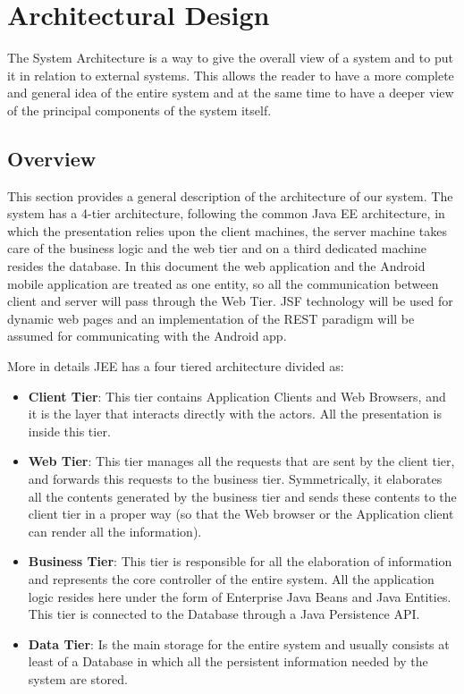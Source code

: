 \chapter{Architectural Design} \label{chap2}
The System Architecture is a way to give the overall view of a system and to put it in relation to external systems. This allows the reader to have a more complete and general idea of the entire system and at the same time to have a deeper view of the principal components of the system itself.

\section{Overview}
This section provides a general description of the architecture of our system.
The system has a 4-tier architecture, following the common Java EE architecture, in which the presentation relies upon the client machines, the server machine takes care of the business logic and the web tier and on a third dedicated machine resides the database.
In this document the web application and the Android mobile application are treated as one entity, so all the communication between client and server will pass through the Web Tier. JSF technology will be used for dynamic web pages and an implementation of the REST paradigm will be assumed for communicating with the Android app.

More in details JEE has a four tiered architecture divided as:
\begin{itemize}
	\item \textbf{Client Tier}: This tier contains Application Clients and Web Browsers, and it is the layer that interacts directly with the actors. All the presentation is inside this tier.
	\item \textbf{Web Tier}: This tier manages all the requests that are sent by the client tier, and forwards this requests to the business tier. Symmetrically, it elaborates all the contents generated by the business tier and sends these contents to the client tier in a proper way (so that the Web browser or the Application client can render all the information).
	\item \textbf{Business Tier}: This tier is responsible for all the elaboration of information and represents the core controller of the entire system. All the application logic resides here under the form of Enterprise Java Beans and Java Entities. This tier is connected to the Database through a Java Persistence API.
	\item \textbf{Data Tier}: Is the main storage for the entire system and usually consists at least of a Database in which all the persistent information needed by the system are stored.
\end{itemize}


